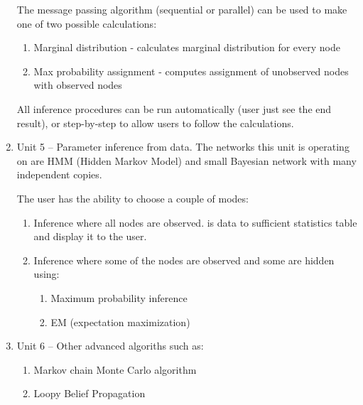 \documentclass{article}
\newcommand{\comment}[2]{
	\todo[color=GreenYellow,inline]{
		\underline{\textbf{#1:}} #2
	}}
\begin{document}
\begin{enumerate}
            The message passing algorithm (sequential or parallel) can be used to make one of two possible calculations:
            \begin{enumerate}
                \item Marginal distribution - calculates marginal distribution for every node
                \item Max probability assignment - computes assignment of unobserved nodes with observed nodes 
            \end{enumerate}

            All inference procedures can be run automatically (user just see the end result), or step-by-step to allow users to follow the calculations.

        \item Unit 5 --
            Parameter inference from data. The networks this unit is operating on are HMM (Hidden Markov Model) and small Bayesian network with many independent copies.

            The user has the ability to choose a couple of modes:
            \begin{enumerate}
                \item Inference where all nodes are observed. is data to sufficient statistics table and display it to the user.
                \item Inference where some of the nodes are observed and some are hidden using:
                \begin{enumerate}
                    \item Maximum probability inference
                    \item EM (expectation maximization) 
                \end{enumerate}
            \end{enumerate}
        \item Unit 6 --
            Other advanced algoriths such as:
        \begin{enumerate}
            \item Markov chain Monte Carlo algorithm
            \item Loopy Belief Propagation 
        \end{enumerate}
    \end{enumerate}
\end{document}
